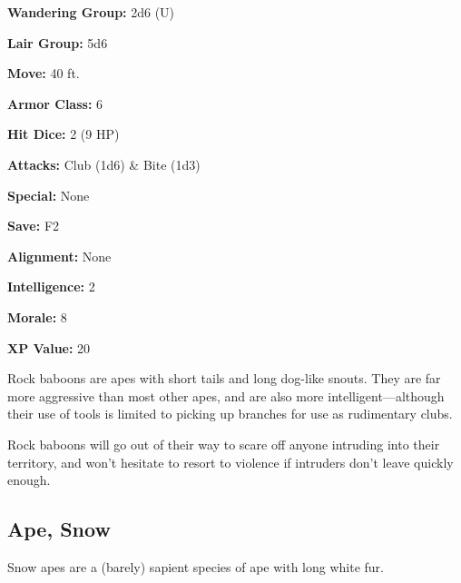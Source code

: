 \begin{multicols*}{2}
{\textbf{Wandering Group:} 2d6 (U)

\textbf{Lair Group:} 5d6

\textbf{Move:} 40 ft.

\textbf{Armor Class:} 6

\textbf{Hit Dice:} 2 (9 HP)

\textbf{Attacks:} Club (1d6) \& Bite (1d3)

\textbf{Special:} None

\textbf{Save:} F2

\textbf{Alignment:} None

\textbf{Intelligence:} 2

\textbf{Morale:} 8

\textbf{XP Value:} 20}

Rock baboons are apes with short tails and long dog-like snouts. They are far more aggressive than most other apes, and are also more intelligent—although their use of tools is limited to picking up branches for use as rudimentary clubs.

Rock baboons will go out of their way to scare off anyone intruding into their territory, and won’t hesitate to resort to violence if intruders don’t leave quickly enough.

\subsection{Ape, Snow}

Snow apes are a (barely) sapient species of ape with long white fur.


\end{multicols*}
